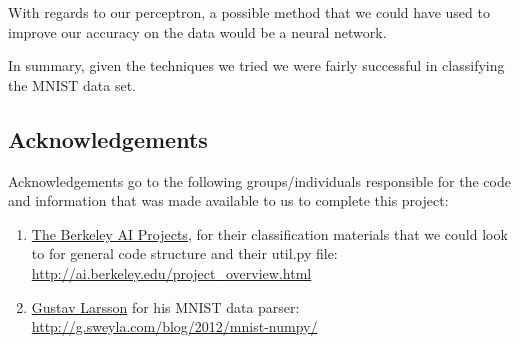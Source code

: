 \documentclass{article}
\theoremstyle{remark}
\begin{document}
     With regards to our perceptron, a possible method that we could have used to improve our accuracy on the data would be a neural network.

     In summary, given the techniques we tried we were fairly successful in classifying the MNIST data set.


     \subsection*{Acknowledgements}

     Acknowledgements go to the following groups/individuals responsible for the code and information that was made available to us to complete this project:

     \begin{enumerate}
      \item \href{http://ai.berkeley.edu/project_overview.html}{The Berkeley AI Projects}, for their classification materials that we could look to for general code structure and their util.py file: \\
      \url{http://ai.berkeley.edu/project_overview.html}
      \item \href{http://g.sweyla.com/blog/2012/mnist-numpy/}{Gustav Larsson} for his MNIST data parser: \\
      \url{http://g.sweyla.com/blog/2012/mnist-numpy/}
     \end{enumerate}







    
\end{document}
